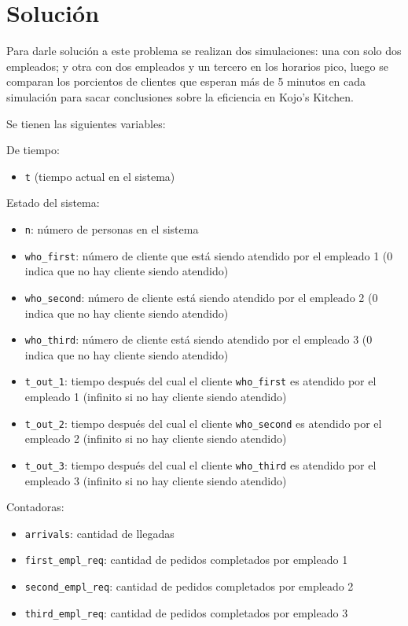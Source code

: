\documentclass{article}
\begin{document}
    \section*{Solución}
        Para darle solución a este problema se realizan dos simulaciones: una con solo dos empleados; y otra con dos empleados y un tercero
        en los horarios pico, luego se comparan los porcientos de clientes que esperan más de 5 minutos en cada simulación para sacar
        conclusiones sobre la eficiencia en Kojo's Kitchen.

        Se tienen las siguientes variables:

        De tiempo:

        \begin{itemize}[label=\textbullet]
            \item \texttt{t} (tiempo actual en el sistema)
        \end{itemize}

        Estado del sistema:

        \begin{itemize}[label=\textbullet]
            \item \texttt{n}: número de personas en el sistema
            \item \texttt{who\_first}: número de cliente que está siendo atendido por el empleado 1 (0 indica que no hay cliente siendo atendido)
            \item \texttt{who\_second}: número de cliente está siendo atendido por el empleado 2 (0 indica que no hay cliente siendo atendido)
            \item \texttt{who\_third}: número de cliente está siendo atendido por el empleado 3 (0 indica que no hay cliente siendo atendido)
            \item \texttt{t\_out\_1}: tiempo después del cual el cliente \texttt{who\_first} es atendido por el empleado 1 (infinito si no hay cliente siendo atendido)
            \item \texttt{t\_out\_2}: tiempo después del cual el cliente \texttt{who\_second} es atendido por el empleado 2 (infinito si no hay cliente siendo atendido)
            \item \texttt{t\_out\_3}: tiempo después del cual el cliente \texttt{who\_third} es atendido por el empleado 3 (infinito si no hay cliente siendo atendido)
        \end{itemize}

        Contadoras:

        \begin{itemize}[label=\textbullet]
            \item \texttt{arrivals}: cantidad de llegadas
            \item \texttt{first\_empl\_req}: cantidad de pedidos completados por empleado 1
            \item \texttt{second\_empl\_req}: cantidad de pedidos completados por empleado 2
            \item \texttt{third\_empl\_req}: cantidad de pedidos completados por empleado 3
        \end{itemize}
\end{document}
